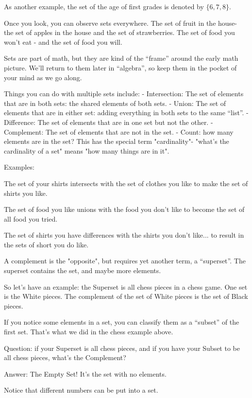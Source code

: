 As another example, the set of the age of first grades is denoted by $\{ 6, 7, 8 \}$.

Once you look, you can observe sets everywhere. The set of fruit in the house- the set of apples in the house and the set of strawberries. The set of food you won't eat - and the set of food you will. 

Sets are part of math, but they are kind of the ``frame'' around the early math picture. We'll return to them later in ``algebra'', so keep them in the pocket of your mind as we go along. 

Things you can do with multiple sets include:
- Intersection: The set of elements that are in both sets: the shared elements of both sets.
- Union: The set of elements that are in either set: adding everything in both sets to the same ``list''.
- Difference: The set of elements that are in one set but not the other.
- Complement: The set of elements that are not in the set.
- Count: how many elements are in the set? This has the special term "cardinality"- "what's the cardinality of a set" means "how many things are in it".

Examples: 

The set of your shirts intersects with the set of clothes you like to make the set of shirts you like. 

The set of food you like unions with the food you don't like to become the set of all food you tried. 

The set of shirts you have differences with the shirts you don't like... to result in the sets of short you do like. 

A complement is the "opposite", but requires yet another term, a ``superset''. The superset contains the set, and maybe more elements. 

So let's have an example: the Superset is all chess pieces in a chess game. One set is the White pieces. The complement of the set of White pieces is the set of Black pieces. 


If you notice some elements in a set, you can classify them as a ``subset'' of the first set. That's what we did in the chess example above. 

Question: if your Superset is all chess pieces, and if you have your Subset to be all chess pieces, what's the Complement? 

Answer: The Empty Set! It's the set with no elements. 

Notice that different numbers can be put into a set. 

